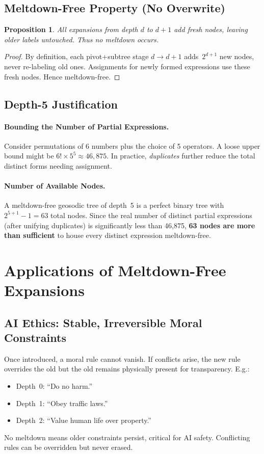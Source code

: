 \documentclass[acmsmall]{acmart}
\newtheorem{proposition}[theorem]{Proposition}
\theoremstyle{definition}
\theoremstyle{remark}
\begin{document}
\subsection{Meltdown-Free Property (No Overwrite)}
\begin{proposition}
All expansions from depth $d$ to $d+1$ add fresh nodes, leaving older labels untouched.
Thus no meltdown occurs.
\end{proposition}
\begin{proof}
By definition, each pivot+subtree stage \(d\to d+1\) adds \(\,2^{d+1}\) new nodes,
never re-labeling old ones. Assignments for newly formed expressions use these
fresh nodes. Hence meltdown-free.
\end{proof}

\subsection{Depth-5 Justification}
\label{subsec:depth5}
\paragraph{Bounding the Number of Partial Expressions.}
Consider permutations of 6 numbers plus the choice of 5 operators. A loose upper
bound might be $6!\times 5^5\approx 46,875$. In practice, \emph{duplicates}
further reduce the total distinct forms needing assignment.

\paragraph{Number of Available Nodes.}
A meltdown-free geosodic tree of depth~5 is a perfect binary tree with
$2^{5+1}-1 = 63$ total nodes. Since the real number of distinct partial expressions
(after unifying duplicates) is significantly less than 46,875, \textbf{63 nodes
are more than sufficient} to house every distinct expression meltdown-free.

\section{Applications of Meltdown-Free Expansions}
\label{sec:applications}

\subsection{AI Ethics: Stable, Irreversible Moral Constraints}
Once introduced, a moral rule cannot vanish. If conflicts arise, the new rule
overrides the old but the old remains physically present for transparency. E.g.:
\begin{itemize}[leftmargin=*]
  \item Depth~0: “Do no harm.”
  \item Depth~1: “Obey traffic laws.”
  \item Depth~2: “Value human life over property.”
\end{itemize}
No meltdown means older constraints persist, critical for AI safety. Conflicting
rules can be overridden but never erased.
\end{document}
